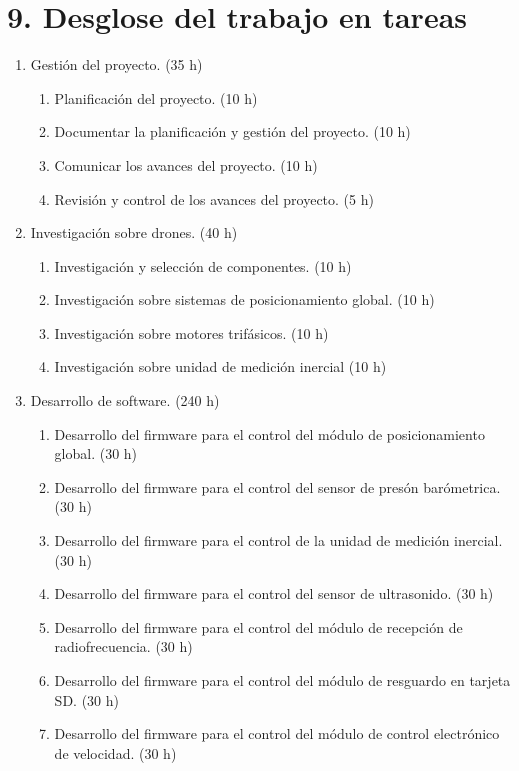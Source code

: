 \documentclass[
11pt, %
]{charter}
\begin{document}
\section{9. Desglose del trabajo en tareas}
\label{sec:wbs}

	\begin{enumerate}
		\item Gesti\'on del proyecto. (35 h)
		      \begin{enumerate}
			      \item Planificaci\'on del proyecto. (10 h)
			      \item Documentar la planificaci\'on y gesti\'on del proyecto. (10 h)
			      \item Comunicar los avances del proyecto. (10 h)
			      \item Revisi\'on y control de los avances del proyecto. (5 h)
		      \end{enumerate}
		\item Investigaci\'on sobre drones. (40 h)
			  \begin{enumerate}
			  	  \item Investigaci\'on y selecci\'on de componentes. (10 h)
			  	  \item Investigaci\'on sobre sistemas de posicionamiento global. (10 h)
			  	  \item Investigaci\'on sobre motores trif\'asicos. (10 h)
			  	  \item Investigaci\'on sobre unidad de medici\'on inercial (10 h) 
			  \end{enumerate}
		\item Desarrollo de software. (240 h)
		      \begin{enumerate}
			      \item Desarrollo del firmware para el control del m\'odulo de posicionamiento global. (30 h)
			      \item Desarrollo del firmware para el control del sensor de pres\'on bar\'ometrica. (30 h)
			      \item Desarrollo del firmware para el control de la unidad de medici\'on inercial. (30 h)
			      \item Desarrollo del firmware para el control del sensor de ultrasonido. (30 h)
			      \item Desarrollo del firmware para el control del m\'odulo de recepci\'on de radiofrecuencia. (30 h)
			      \item Desarrollo del firmware para el control del m\'odulo de resguardo en tarjeta SD. (30 h)
			      \item Desarrollo del firmware para el control del m\'odulo de control electr\'onico de velocidad. (30 h)

\end{enumerate}
\end{enumerate}
\end{document}
